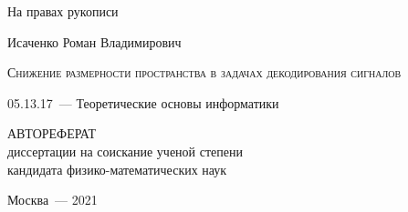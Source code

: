 \documentclass[11pt, a5paper]{dissert}
\begin{document}
\begin{titlepage}
	\begin{flushright}
		{На правах рукописи}
	\end{flushright}
	\vspace{1.5cm}
	\begin{center}
		{Исаченко Роман Владимирович}
		\par
		\vspace{2cm}
		\textsc{Снижение размерности пространства в задачах декодирования сигналов}
		\par
		\vspace{2cm}
		{05.13.17~--- Теоретические основы информатики}
		\par
		\vspace{2cm}
		{АВТОРЕФЕРАТ\\
		диссертации на соискание ученой степени\\
		кандидата физико-математических наук}
	\end{center}
	\par
	\vspace{3.5cm}
	\begin{center}
		{Москва~--- 2021}
	\end{center}
\end{titlepage}


\setcounter{page}{2}
\end{document}
